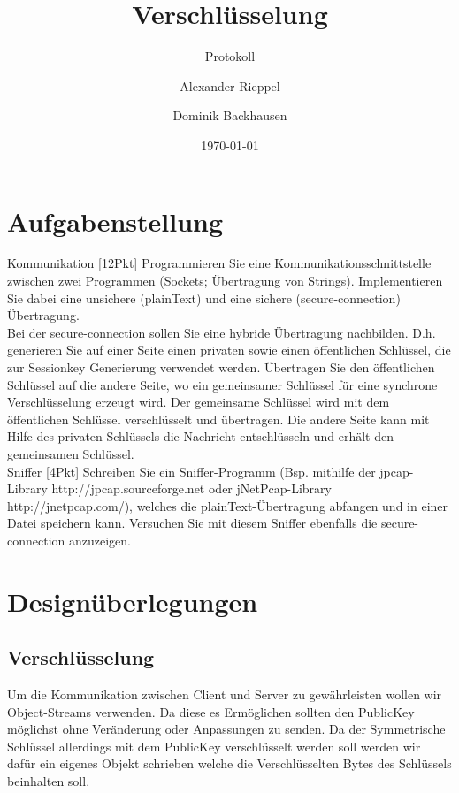 \documentclass[a4paper,12pt]{scrreprt}
\begin{document}
\author{Alexander Rieppel \and Dominik Backhausen} %
\title{Verschlüsselung} %
\subject{VSDB} %
\subtitle{Protokoll} %
\date{\today} %
\publishers{5AHITT} %

\maketitle
\tableofcontents


\chapter{Aufgabenstellung}
	Kommunikation [12Pkt]
	Programmieren Sie eine Kommunikationsschnittstelle zwischen zwei Programmen (Sockets; Übertragung von Strings). Implementieren Sie dabei eine unsichere (plainText) und eine sichere (secure-connection) Übertragung.\\
	
	Bei der secure-connection sollen Sie eine hybride Übertragung nachbilden. D.h. generieren Sie auf einer Seite einen privaten sowie einen öffentlichen Schlüssel, die zur Sessionkey Generierung verwendet werden. Übertragen Sie den öffentlichen Schlüssel auf die andere Seite, wo ein gemeinsamer Schlüssel für eine synchrone Verschlüsselung erzeugt wird. Der gemeinsame Schlüssel wird mit dem öffentlichen Schlüssel verschlüsselt und übertragen. Die andere Seite kann mit Hilfe des privaten Schlüssels die Nachricht entschlüsseln und erhält den gemeinsamen Schlüssel.\\
	
	Sniffer [4Pkt]
	Schreiben Sie ein Sniffer-Programm (Bsp. mithilfe der jpcap-Library http://jpcap.sourceforge.net  oder jNetPcap-Library http://jnetpcap.com/), welches die plainText-Übertragung abfangen und in einer Datei speichern kann. Versuchen Sie mit diesem Sniffer ebenfalls die secure-connection anzuzeigen.
\chapter{Designüberlegungen}
\section{Verschlüsselung}
	Um die Kommunikation zwischen Client und Server zu gewährleisten wollen wir Object-Streams verwenden. Da diese es Ermöglichen sollten den PublicKey möglichst ohne Veränderung oder Anpassungen zu senden.
	Da der Symmetrische Schlüssel allerdings mit dem PublicKey verschlüsselt werden soll werden wir dafür ein eigenes Objekt schrieben welche die Verschlüsselten Bytes des Schlüssels beinhalten soll. 
	
\end{document}
